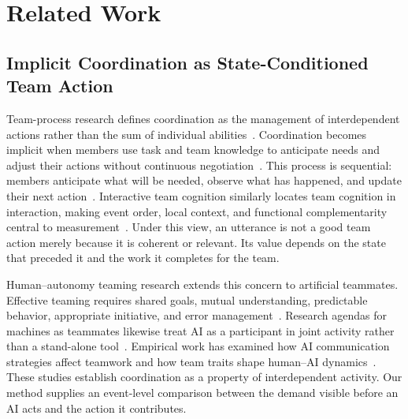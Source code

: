 \documentclass[manuscript,review,anonymous]{acmart}
\begin{document}
\section{Related Work}

\subsection{Implicit Coordination as State-Conditioned Team Action}
Team-process research defines coordination as the management of interdependent actions rather than the sum of individual abilities~\cite{marks2001temporally}. Coordination becomes implicit when members use task and team knowledge to anticipate needs and adjust their actions without continuous negotiation~\cite{rico2008implicit}. This process is sequential: members anticipate what will be needed, observe what has happened, and update their next action~\cite{rico2019adaptation}. Interactive team cognition similarly locates team cognition in interaction, making event order, local context, and functional complementarity central to measurement~\cite{cooke2013interactive}. Under this view, an utterance is not a good team action merely because it is coherent or relevant. Its value depends on the state that preceded it and the work it completes for the team.

Human--autonomy teaming research extends this concern to artificial teammates. Effective teaming requires shared goals, mutual understanding, predictable behavior, appropriate initiative, and error management~\cite{klein2004challenges,oneill2020hat}. Research agendas for machines as teammates likewise treat AI as a participant in joint activity rather than a stand-alone tool~\cite{seeber2020machines,berretta2023defining}. Empirical work has examined how AI communication strategies affect teamwork and how team traits shape human--AI dynamics~\cite{zhang2023teammate,bendell2025asi}. These studies establish coordination as a property of interdependent activity. Our method supplies an event-level comparison between the demand visible before an AI acts and the action it contributes.
\end{document}
